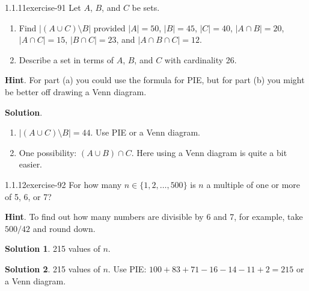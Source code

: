 \documentclass[twoside,11pt,]{book}
\numberwithin{equation}{chapter}
\newcommand{\card}[1]{\left| #1 \right|}
\begin{document}
\begin{divisionsolution}{1.1.11}{}{exercise-91}%
\hypertarget{p-1413}{}%
Let \(A\), \(B\), and \(C\) be sets.\leavevmode%
\begin{enumerate}[label=(\alph*)]
\item\hypertarget{li-1032}{}Find \(\card{(A \cup C)\setminus B}\) provided \(\card{A} = 50\), \(\card{B} = 45\), \(\card{C} = 40\), \(\card{A\cap B} = 20\), \(\card{A \cap C} = 15\), \(\card{B \cap C} = 23\), and \(\card{A \cap B \cap C} = 12\).%
\item\hypertarget{li-1033}{}Describe a set in terms of \(A\), \(B\), and \(C\) with cardinality 26.%
\end{enumerate}
%
\par\smallskip%
\noindent\textbf{Hint}.\quad%
\hypertarget{p-1414}{}%
For part (a) you could use the formula for PIE, but for part (b) you might be better off drawing a Venn diagram.%
\par\smallskip%
\noindent\textbf{Solution}.\quad%
\hypertarget{p-1415}{}%
\leavevmode%
\begin{enumerate}[label=(\alph*)]
\item\hypertarget{li-1034}{}\(\card{(A \cup C)\setminus B} = 44\). Use PIE or a Venn diagram.%
\item\hypertarget{li-1035}{}One possibility: \((A \cup B) \cap C\). Here using a Venn diagram is quite a bit easier.%
\end{enumerate}
%
\end{divisionsolution}%
\begin{divisionsolution}{1.1.12}{}{exercise-92}%
\hypertarget{p-1421}{}%
For how many \(n \in \{1,2, \ldots, 500\}\) is \(n\) a multiple of one or more of 5, 6, or 7?%
\par\smallskip%
\noindent\textbf{Hint}.\quad%
\hypertarget{p-1423}{}%
To find out how many numbers are divisible by 6 and 7, for example, take \(500/42\) and round down.%
\par\smallskip%
\noindent\textbf{Solution 1}.\quad%
\hypertarget{p-1424}{}%
215 values of \(n\text{.}\)%
\par\smallskip%
\noindent\textbf{Solution 2}.\quad%
\hypertarget{p-1425}{}%
215 values of \(n\text{.}\) Use PIE: \(100 + 83 + 71 - 16 - 14 -11 + 2 = 215\) or a Venn diagram.%
\end{divisionsolution}%
\end{document}
